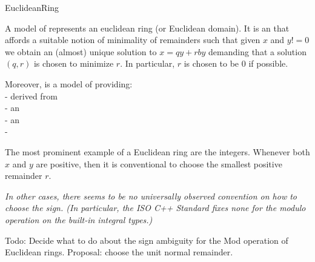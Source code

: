 \begin{ccRefConcept}{EuclideanRing}


\ccDefinition

A model of  represents an euclidean ring (or Euclidean domain). 
It is an  that affords a suitable notion of minimality of remainders 
such that given $x$ and $y != 0$ we obtain an (almost) unique solution to 
$x = qy + r by$ demanding that a solution $(q,r)$ is chosen to minimize $r$. 
In particular, $r$ is chosen to be $0$ if possible.

Moreover,  is a model of 
 providing:\\
 
-  derived from  \\
-  an \\
-  an \\
- \\





The most prominent example of a Euclidean ring are the integers. 
Whenever both $x$ and $y$ are positive, then it is conventional to choose 
the smallest positive remainder $r$. 


{\em \small
In other cases, there seems to be no universally observed convention on how to choose 
the sign. (In particular, the ISO C++ Standard fixes none for the modulo operation 
on the built-in integral types.)

Todo: Decide what to do about the sign ambiguity for the Mod operation of Euclidean rings.
Proposal: choose the unit normal remainder. 
}



\ccRefines

\ccSeeAlso

\\
\\
\\
\\
\\
\\
\\

\ccHasModels


\end{ccRefConcept}